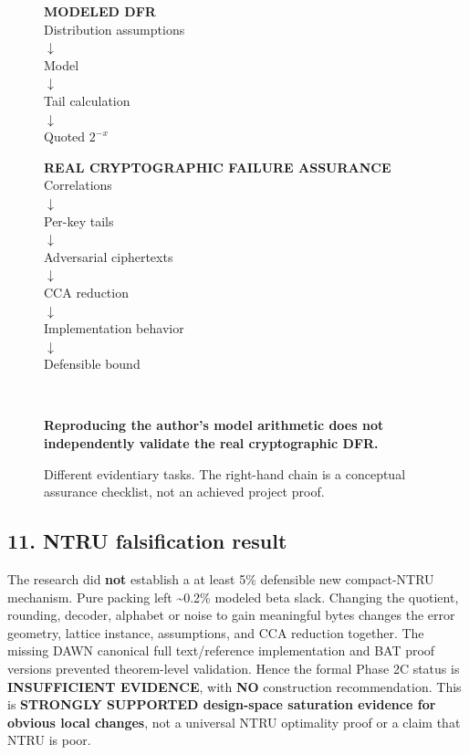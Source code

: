 \documentclass[
  10pt,
  a4paper,
]{article}
\begin{document}
\begin{figure}[htbp]
\centering
\begin{minipage}[t]{.45\linewidth}
\textsf{\textbf{MODELED DFR}}\\[10pt]
Distribution assumptions\\$\downarrow$\\Model\\$\downarrow$\\Tail calculation\\$\downarrow$\\Quoted $2^{-x}$
\end{minipage}\hfill
\begin{minipage}[t]{.48\linewidth}
\textsf{\textbf{REAL CRYPTOGRAPHIC FAILURE ASSURANCE}}\\[10pt]
Correlations\\$\downarrow$\\Per-key tails\\$\downarrow$\\Adversarial ciphertexts\\$\downarrow$\\CCA reduction\\$\downarrow$\\Implementation behavior\\$\downarrow$\\Defensible bound
\end{minipage}\\[20pt]
\begin{minipage}{.94\linewidth}\textbf{Reproducing the author's model arithmetic does not independently validate the real cryptographic DFR.}\end{minipage}
\caption{Different evidentiary tasks. The right-hand chain is a conceptual assurance checklist, not an achieved project proof.}\label{fig:dfr}
\end{figure}

\hypertarget{ntru-falsification-result}{%
\subsection{11. NTRU falsification
result}\label{ntru-falsification-result}}

The research did \textbf{not} establish a at least 5\% defensible new
compact-NTRU mechanism. Pure packing left \textasciitilde0.2\% modeled
beta slack. Changing the quotient, rounding, decoder, alphabet or noise
to gain meaningful bytes changes the error geometry, lattice instance,
assumptions, and CCA reduction together. The missing DAWN canonical full
text/reference implementation and BAT proof versions prevented
theorem-level validation. Hence the formal Phase 2C status is
\textbf{INSUFFICIENT EVIDENCE}, with \textbf{NO} construction
recommendation. This is \textbf{STRONGLY SUPPORTED design-space
saturation evidence for obvious local changes}, not a universal NTRU
optimality proof or a claim that NTRU is poor.
\end{document}

